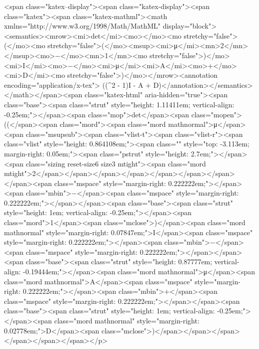 <span class="katex--display"><span class="katex-display"><span class="katex"><span class="katex-mathml"><math xmlns="http://www.w3.org/1998/Math/MathML" display="block"><semantics><mrow><mi>det</mi><mo>⁡</mo><mo stretchy="false">(</mo><mo stretchy="false">(</mo><msup><mi>μ</mi><mn>2</mn></msup><mo>−</mo><mn>1</mn><mo stretchy="false">)</mo><mi>I</mi><mo>−</mo><mi>μ</mi><mi>A</mi><mo>+</mo><mi>D</mi><mo stretchy="false">)</mo></mrow><annotation encoding="application/x-tex"> \det ((\mu^2 - 1)I - \mu A + D)</annotation></semantics></math></span><span class="katex-html" aria-hidden="true"><span class="base"><span class="strut" style="height: 1.11411em; vertical-align: -0.25em;"></span><span class="mop">det</span><span class="mopen">((</span><span class="mord"><span class="mord mathnormal">μ</span><span class="msupsub"><span class="vlist-t"><span class="vlist-r"><span class="vlist" style="height: 0.864108em;"><span class="" style="top: -3.113em; margin-right: 0.05em;"><span class="pstrut" style="height: 2.7em;"></span><span class="sizing reset-size6 size3 mtight"><span class="mord mtight">2</span></span></span></span></span></span></span></span><span class="mspace" style="margin-right: 0.222222em;"></span><span class="mbin">−</span><span class="mspace" style="margin-right: 0.222222em;"></span></span><span class="base"><span class="strut" style="height: 1em; vertical-align: -0.25em;"></span><span class="mord">1</span><span class="mclose">)</span><span class="mord mathnormal" style="margin-right: 0.07847em;">I</span><span class="mspace" style="margin-right: 0.222222em;"></span><span class="mbin">−</span><span class="mspace" style="margin-right: 0.222222em;"></span></span><span class="base"><span class="strut" style="height: 0.87777em; vertical-align: -0.19444em;"></span><span class="mord mathnormal">μ</span><span class="mord mathnormal">A</span><span class="mspace" style="margin-right: 0.222222em;"></span><span class="mbin">+</span><span class="mspace" style="margin-right: 0.222222em;"></span></span><span class="base"><span class="strut" style="height: 1em; vertical-align: -0.25em;"></span><span class="mord mathnormal" style="margin-right: 0.02778em;">D</span><span class="mclose">)</span></span></span></span></span></span></p>
